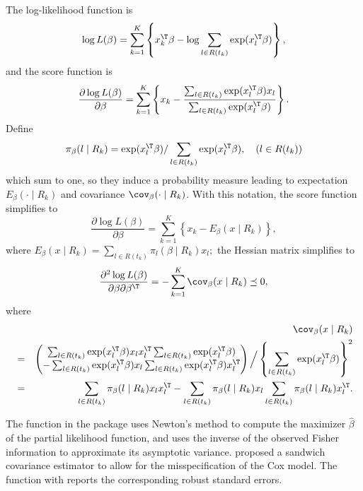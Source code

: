 The log-likelihood function is
\[
\log L(\beta)=\sum_{k=1}^{K}\left\{ x_{k}^{\T}\beta-\log\sum_{l\in R(t_{k})}\exp(x_{l}^{\T}\beta)\right\} ,
\]
and the score function is
\[
\frac{\partial\log L(\beta)}{\partial\beta}=\sum_{k=1}^{K}\left\{ x_{k}-\frac{\sum_{l\in R(t_{k})}\exp(x_{l}^{\T}\beta)x_{l}}{\sum_{l\in R(t_{k})}\exp(x_{l}^{\T}\beta)}\right\} .
\]
Define 
\[
\pi_{\beta}(l\mid R_{k})=\exp(x_{l}^{\T}\beta)/\sum_{l\in R(t_{k})}\exp(x_{l}^{\T}\beta),\quad(l\in R(t_{k}))
\]
which sum to one, so they induce a probability measure leading to
expectation $E_{\beta}(\cdot\mid R_{k})$ and covariance $\cov_{\beta}(\cdot\mid R_{k})$.
With this notation, the score function simplifies to
\[
\frac{\partial\log L(\beta)}{\partial\beta}=\sum_{k=1}^{K}\left\{ x_{k}-E_{\beta}(x\mid R_{k})\right\} ,
\]
where 
$
E_{\beta}(x\mid R_{k}) = \sum_{l\in R(t_{k})}  \pi_{l}(\beta\mid R_{k}) x_l;
$
the Hessian matrix simplifies to
$$
\frac{\partial^{2}\log L(\beta)}{\partial\beta\partial\beta^{\T}}  =-\sum_{k=1}^{K}\cov_{\beta}(x\mid R_{k})\preceq 0,
$$
where
\begin{eqnarray*}
&&\cov_{\beta}(x\mid R_{k}) \\
&=&  \begin{pmatrix}
\sum_{l\in R(t_{k})}\exp(x_{l}^{\T}\beta)x_{l}x_{l}^{\T}\sum_{l\in R(t_{k})}\exp(x_{l}^{\T}\beta) \\
-\sum_{l\in R(t_{k})}\exp(x_{l}^{\T}\beta)x_{l}\sum_{l\in R(t_{k})}\exp(x_{l}^{\T}\beta)x_{l}^{\T} 
\end{pmatrix}   \Big / \left\{ \sum_{l\in R(t_{k})}\exp(x_{l}^{\T}\beta)\right\} ^{2} \\
&=&
\sum_{l\in R(t_{k})}\pi_{\beta}(l\mid R_{k})x_{l}x_{l}^{\T}-\sum_{l\in R(t_{k})}\pi_{\beta}(l\mid R_{k})x_{l}\sum_{l\in R(t_{k})}\pi_{\beta}(l\mid R_{k})x_{l}^{\T} . 
\end{eqnarray*}
%
%
 

The  function in the  package  uses Newton's method to compute the maximizer $\hat{\beta}$ of the partial likelihood function, and uses the inverse of the observed Fisher information to approximate its asymptotic variance. 
\citet{lin1989robust} proposed a sandwich covariance estimator to allow for the misspecification of the Cox model.  The  function with  reports the corresponding robust standard errors. 



